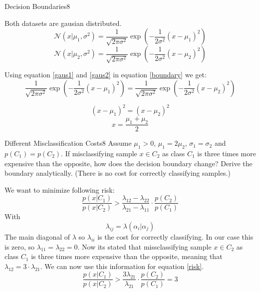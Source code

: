 \begin{questions}
\begin{question}{Decision Boundaries}{8}
\begin{answer}
Both datasets are gausian distributed.
\begin{equation}\label{gaus1}
	\mathcal{N}(x|\mu_1, \sigma^2) = \frac{1}{\sqrt{2\pi\sigma^2}} \exp(-\frac{1}{2\sigma^2}(x-\mu_1)^2)
\end{equation}
\begin{equation}\label{gaus2}
\mathcal{N}(x|\mu_2, \sigma^2) = \frac{1}{\sqrt{2\pi\sigma^2}} \exp(-\frac{1}{2\sigma^2}(x-\mu_2)^2)
\end{equation}

Using equation \ref{gaus1} and \ref{gaus2} in equation \ref{boundary} we get:
\begin{equation}
	\frac{1}{\sqrt{2\pi\sigma^2}} \exp(-\frac{1}{2\sigma^2}(x-\mu_1)^2) = \frac{1}{\sqrt{2\pi\sigma^2}} \exp(-\frac{1}{2\sigma^2}(x-\mu_2)^2)
\end{equation}

\begin{equation}
	(x-\mu_1)^2 = (x-\mu_2)^2
\end{equation}
\begin{equation}
	x = \frac{\mu_1 + \mu_2}{2}
\end{equation}

\end{answer}

\end{question}


\begin{question}{Different Misclassification Costs}{8}
Assume $\mu_1 > 0$, $\mu_1 = 2\mu_2$, $\sigma_1=\sigma_2$ and $p(C_1) = p(C_2)$. If misclassifying sample $x \in C_2$ as class $C_1$ is three times more expensive than the opposite, how does the decision boundary change? Derive the boundary analytically.
(There is no cost for correctly classifying samples.)

\begin{answer}
We want to minimize following risk:
\begin{equation}
	\frac{p(x|C_1)}{p(x|C_2)} > \frac{\lambda_{12}-\lambda_{22}}{\lambda_{21}-\lambda_{11}} \cdot \frac{p(C_2)}{p(C_1)}
\end{equation}
With 
\begin{equation} \label{risk}
	\lambda_{ij} = \lambda(\alpha_i|\alpha_j)
\end{equation}
The main diagonal of $\lambda$ so $\lambda_{ii}$ is the cost for correctly classifying. In our case this is zero, so $\lambda_{11} = \lambda_{22} = 0$.
Now its stated that missclassifying sample $x\in C_2$ as class $C_1$ is three times more expensive than the opposite, meaning that $\lambda_{12} = 3\cdot\lambda_{21}$. We can now use this information for equation \ref{risk}.
\begin{equation}
	\frac{p(x|C_1)}{p(x|C_2)} > \frac{3\lambda_{21}}{\lambda_{21}}\cdot \frac{p(C_2)}{p(C_1)} = 3
\end{equation} 


\end{answer}
\end{question}
\end{questions}
